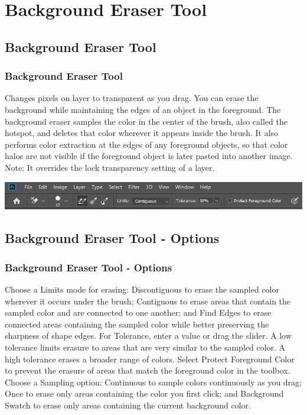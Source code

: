 \documentclass{beamer}
\begin{document}
	
	\section{Background Eraser Tool}
	\subsection{Background Eraser Tool}
	\begin{frame}
		\frametitle{Background Eraser Tool}
		\begin{outline}
			\1 Changes pixels on layer to transparent as you drag.
			\1 You can erase the background while maintaining the edges of an object in the foreground.
			\1 The background eraser samples the color in the center of the brush, also called the hotspot, and deletes that color wherever it appears inside the brush. 
			\1 It also performs color extraction at the edges of any foreground objects, so that color halos are not visible if the foreground object is later pasted into another image.
			\1 Note:  It overrides the lock transparency setting of a layer.
		\end{outline}
		\begin{center}
		\includegraphics[width = 1.0\textwidth]{images/background eraser.png}
	\end{center}
	\end{frame}

	\subsection{Background Eraser Tool - Options}
	\begin{frame}
	\frametitle{Background Eraser Tool - Options}
	\begin{outline}
		\1 Choose a Limits mode for erasing: Discontiguous to erase the sampled color wherever it occurs under the brush; Contiguous to erase areas that contain the sampled color and are connected to one another; and Find Edges to erase connected areas containing the sampled color while better preserving the sharpness of shape edges.
		\1 For Tolerance, enter a value or drag the slider. A low tolerance limits erasure to areas that are very similar to the sampled color. A high tolerance erases a broader range of colors.
		\1 Select Protect Foreground Color to prevent the erasure of areas that match the foreground color in the toolbox.
		\1 Choose a Sampling option: Continuous to sample colors continuously as you drag; Once to erase only areas containing the color you first click; and Background Swatch to erase only areas containing the current background color.
	\end{outline}
\end{frame}
\end{document}
